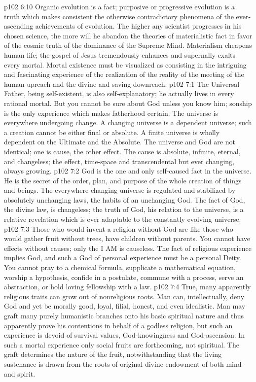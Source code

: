 \vs p102 6:10 Organic evolution is a fact; purposive or progressive evolution is a truth which makes consistent the otherwise contradictory phenomena of the ever\hyp{}ascending achievements of evolution. The higher any scientist progresses in his chosen science, the more will he abandon the theories of materialistic fact in favor of the cosmic truth of the dominance of the Supreme Mind. Materialism cheapens human life; the gospel of Jesus tremendously enhances and supernally exalts every mortal. Mortal existence must be visualized as consisting in the intriguing and fascinating experience of the realization of the reality of the meeting of the human upreach and the divine and saving downreach.
\vs p102 7:1 The Universal Father, being self\hyp{}existent, is also self\hyp{}explanatory; he actually lives in every rational mortal. But you cannot be sure about God unless you know him; sonship is the only experience which makes fatherhood certain. The universe is everywhere undergoing change. A changing universe is a dependent universe; such a creation cannot be either final or absolute. A finite universe is wholly dependent on the Ultimate and the Absolute. The universe and God are not identical; one is cause, the other effect. The cause is absolute, infinite, eternal, and changeless; the effect, time\hyp{}space and transcendental but ever changing, always growing.
\vs p102 7:2 God is the one and only self\hyp{}caused fact in the universe. He is the secret of the order, plan, and purpose of the whole creation of things and beings. The everywhere\hyp{}changing universe is regulated and stabilized by absolutely unchanging laws, the habits of an unchanging God. The fact of God, the divine law, is changeless; the truth of God, his relation to the universe, is a relative revelation which is ever adaptable to the constantly evolving universe.
\pc \vs p102 7:3 Those who would invent a religion without God are like those who would gather fruit without trees, have children without parents. You cannot have effects without causes; only the I AM is causeless. The fact of religious experience implies God, and such a God of personal experience must be a personal Deity. You cannot pray to a chemical formula, supplicate a mathematical equation, worship a hypothesis, confide in a postulate, commune with a process, serve an abstraction, or hold loving fellowship with a law.
\vs p102 7:4 True, many apparently religious traits can grow out of nonreligious roots. Man can, intellectually, deny God and yet be morally good, loyal, filial, honest, and even idealistic. Man may graft many purely humanistic branches onto his basic spiritual nature and thus apparently prove his contentions in behalf of a godless religion, but such an experience is devoid of survival values, God\hyp{}knowingness and God\hyp{}ascension. In such a mortal experience only social fruits are forthcoming, not spiritual. The graft determines the nature of the fruit, notwithstanding that the living sustenance is drawn from the roots of original divine endowment of both mind and spirit.
